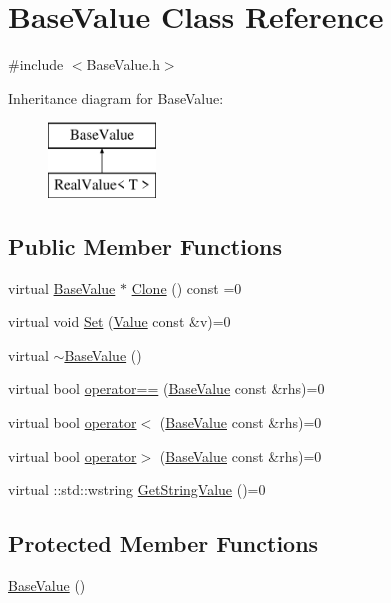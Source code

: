 \hypertarget{class_base_value}{}\section{Base\+Value Class Reference}
\label{class_base_value}


{\ttfamily \#include $<$Base\+Value.\+h$>$}

Inheritance diagram for Base\+Value\+:\begin{figure}[H]
\begin{center}
\leavevmode
\includegraphics[height=2.000000cm]{class_base_value}
\end{center}
\end{figure}
\subsection*{Public Member Functions}
\begin{DoxyCompactItemize}
\item 
virtual \hyperlink{class_base_value}{Base\+Value} $\ast$ \hyperlink{class_base_value_ae6debe7ccc4f9221383f16185f3f206b}{Clone} () const  =0
\item 
virtual void \hyperlink{class_base_value_ae50673bc7f832fafd9f7b8c1430e5641}{Set} (\hyperlink{class_value}{Value} const \&v)=0
\item 
virtual \hyperlink{class_base_value_af537e12c53c9305bf69508f963808cd6}{$\sim$\+Base\+Value} ()
\item 
virtual bool \hyperlink{class_base_value_a421e9d3f55c744c64376a5d828625932}{operator==} (\hyperlink{class_base_value}{Base\+Value} const \&rhs)=0
\item 
virtual bool \hyperlink{class_base_value_af7e0e4bcc6ec2a72e10a2716224976c0}{operator$<$} (\hyperlink{class_base_value}{Base\+Value} const \&rhs)=0
\item 
virtual bool \hyperlink{class_base_value_a181585ec22744fcdd975624586cce3a4}{operator$>$} (\hyperlink{class_base_value}{Base\+Value} const \&rhs)=0
\item 
virtual \+::std\+::wstring \hyperlink{class_base_value_a951677977777ab23c288aed5cf9d7d38}{Get\+String\+Value} ()=0
\end{DoxyCompactItemize}
\subsection*{Protected Member Functions}
\begin{DoxyCompactItemize}
\item 
\hyperlink{class_base_value_a0e78d6c1fb62482a31c013c3cc73c70c}{Base\+Value} ()
\end{DoxyCompactItemize}


